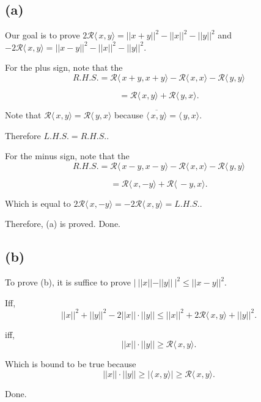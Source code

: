 \documentclass[12pt]{article}%
\begin{document}
\subsection{(a)}
Our goal is to prove $ 2\mathcal{R}\langle\,x,y\rangle=||x+ y||^2-||x||^2-||y||^2$ and $ -2\mathcal{R}\langle\,x,y\rangle=||x-y||^2-||x||^2-||y||^2.$

For the plus sign, note that the $$R.H.S.=\mathcal{R}\langle\,x + y,x + y\rangle-\mathcal{R}\langle\,x,x\rangle-\mathcal{R}\langle\,y,y\rangle$$

$$=\mathcal{R}\langle\,x,y\rangle+\mathcal{R}\langle\,y,x\rangle.$$

Note that $\mathcal{R}\langle\,x,y\rangle = \mathcal{R}\langle\,y,x\rangle$ because $\overline{\langle\,x,y\rangle}=\langle\,y,x\rangle.$

Therefore $L.H.S.=R.H.S..$

For the minus sign, note that the $$R.H.S.=\mathcal{R}\langle\,x - y,x - y\rangle-\mathcal{R}\langle\,x,x\rangle-\mathcal{R}\langle\,y,y\rangle$$

$$=\mathcal{R}\langle\,x,-y\rangle+\mathcal{R}\langle\,-y,x\rangle.$$ 

Which is equal to $2\mathcal{R}\langle\,x,-y\rangle=-2\mathcal{R}\langle\,x,y\rangle=L.H.S..$

Therefore, (a) is proved. Done.

\subsection{(b)}
To prove (b), it is suffice to prove $|~||x||-||y||~|^2\leq ||x-y||^2.$

Iff, $$||x||^2+||y||^2-2||x|| \cdot ||y||\leq ||x||^2 + 2\mathcal{R}\langle\,x,y\rangle+||y||^2.$$

iff, $$||x||\cdot ||y||\geq \mathcal{R}\langle\,x,y\rangle.$$

Which is bound to be true because $$||x||\cdot ||y||\geq |\langle\,x,y\rangle|\geq \mathcal{R}\langle\,x,y\rangle.$$

Done.
\end{document}
